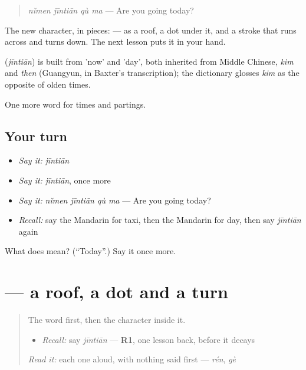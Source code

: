 \begin{quote}
\textbf{} \emph{nǐmen jīntiān qù ma} — Are you going today?
\end{quote}

The new character, in pieces:  —  as a roof, a dot under it, and a stroke that runs across and turns down. The next lesson puts it in your hand.

\begin{cousinweb}
\textbf{} (\emph{jīntiān}) is built from  'now' and  'day', both inherited from Middle Chinese, \emph{kim} and \emph{then} (Guangyun, in Baxter's transcription); the dictionary glosses \emph{kim} as the opposite of olden times.
\end{cousinweb}

\begin{grammarlens}[title={What you've built}]
One more word for times and partings.
\end{grammarlens}

\subsection*{Your turn}
\begin{itemize}
\raggedright
  \item \emph{Say it:} \emph{jīntiān}
  \item \emph{Say it:} \emph{jīntiān}, once more
  \item \emph{Say it:} \emph{nǐmen jīntiān qù ma} — Are you going today?
  \item \emph{Recall:} say the Mandarin for taxi, then the Mandarin for day, then say \emph{jīntiān} again
\end{itemize}

\begin{tcolorbox}[breakable,colback=teal!4,colframe=teal!35!black,title={Before you move on}]
What does  mean? (\textquotedblleft{}Today\textquotedblright{}.) Say it once more.
\end{tcolorbox}
\section[\texorpdfstring{\zh{今} (jīn)}{今 (jīn)}]{ — a roof, a dot and a turn}

\label{lesson:ZH-W45-jin}



\begin{quote}
The word first, then the character inside it.

\begin{itemize}
\raggedright
  \item \emph{Recall:} say \emph{jīntiān} — \textbf{R1}, one lesson back, before it decays
\end{itemize}

\begin{quote}
 
\end{quote}

\emph{Read it:} each one aloud, with nothing said first — \emph{rén}, \emph{gè}
\end{quote}

